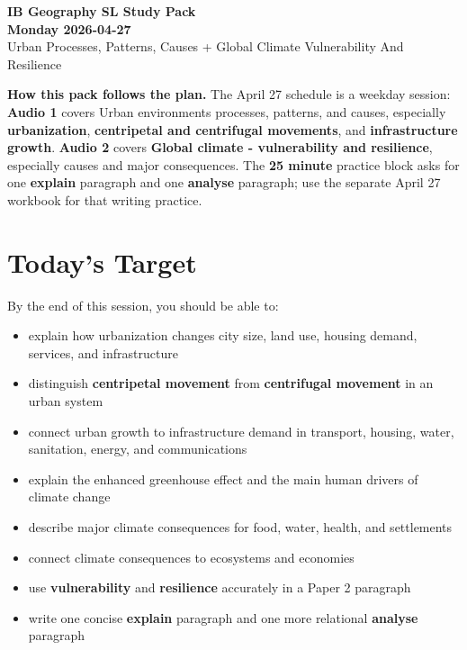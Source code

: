 \documentclass[11pt,a4paper]{article}
\newcommand{\term}[1]{\textcolor{HeadingBlue}{\textbf{#1}}}
\newcommand{\exam}[1]{\textcolor{AccentTeal}{\textbf{#1}}}
\newcommand{\boxnote}[3]{%
\noindent\colorbox{#1}{%
  \begin{minipage}{0.965\textwidth}
  \sffamily
  \textbf{\textcolor{HeadingBlue}{#2}} #3
  \end{minipage}
}}
\begin{document}
\begin{center}
  {\sffamily\bfseries\color{HeadingBlue}\LARGE IB Geography SL Study Pack}\\[0.25em]
  {\sffamily\bfseries\color{AccentTeal}\Large Monday 2026-04-27}\\[0.35em]
  {\sffamily\color{TextInk}Urban Processes, Patterns, Causes + Global Climate Vulnerability And Resilience}
\end{center}

\vspace{0.5em}

\boxnote{SoftBlue}{How this pack follows the plan.}{The April 27 schedule is a
weekday session: \term{Audio 1} covers Urban environments processes, patterns,
and causes, especially \term{urbanization}, \term{centripetal and centrifugal
movements}, and \term{infrastructure growth}. \term{Audio 2} covers
\term{Global climate - vulnerability and resilience}, especially causes and
major consequences. The \term{25 minute} practice block asks for one
\exam{explain} paragraph and one \exam{analyse} paragraph; use the separate
April 27 workbook for that writing practice.}

\section{Today's Target}

By the end of this session, you should be able to:

\begin{itemize}
  \item explain how urbanization changes city size, land use, housing demand,
  services, and infrastructure
  \item distinguish \term{centripetal movement} from \term{centrifugal
  movement} in an urban system
  \item connect urban growth to infrastructure demand in transport, housing,
  water, sanitation, energy, and communications
  \item explain the enhanced greenhouse effect and the main human drivers of
  climate change
  \item describe major climate consequences for food, water, health, and
  settlements
  \item connect climate consequences to ecosystems and economies
  \item use \term{vulnerability} and \term{resilience} accurately in a Paper 2
  paragraph
  \item write one concise \exam{explain} paragraph and one more relational
  \exam{analyse} paragraph
\end{itemize}
\end{document}
